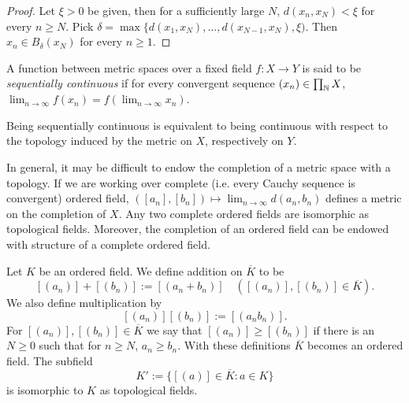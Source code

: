     \begin{proof}
        Let $\xi>0$ be given, then for a sufficiently large $N$, $d(x_n,x_N)<\xi$ for every $n\geq N$. Pick $\delta = \max\{ d(x_1,x_N),\dots,d(x_{N-1},x_N),\xi)$. Then $x_n\in B_\delta(x_N)$ for every $n\geq 1$.
    \end{proof}
    \begin{definition}
        A function between metric spaces over a fixed field $f:X\rightarrow Y$ is said to be \textit{sequentially continuous} if for every convergent sequence $(x_n)\in \prod_{\mathbb{N}} X$, $\lim_{n\to \infty} f(x_n)=f(\lim_{n\to \infty} x_n)$. 
    \end{definition}
    \begin{remark}
        Being sequentially continuous is equivalent to being continuous with respect to the topology induced by the metric on $X$, respectively on $Y$.
    \end{remark}
    In general, it may be difficult to endow the completion of a metric space with a topology. If we are working over complete (i.e. every Cauchy sequence is convergent) ordered field, $([a_n],[b_n])\mapsto \lim_{n\to\infty} d(a_n,b_n)$ defines a metric on the completion of $X$. Any two complete ordered fields are isomorphic as topological fields. Moreover, the completion of an ordered field can be endowed with structure of a complete ordered field.
    \begin{lemma}
        Let $K$ be an ordered field. We define addition on $\overline{K}$ to be 
        $$[(a_n)]+[(b_n)]:=[(a_n+b_n)] \quad ([(a_n)],[(b_n)]\in \overline{K}).$$
        We also define multiplication by 
        $$[(a_n)][(b_n)]:= [(a_nb_n)].$$
        For $[(a_n)],[(b_n)]\in \overline{K}$ we say that $[(a_n)]\geq [(b_n)]$ if there is an $N\geq 0$ such that for $n\geq N$, $a_n\geq b_n$. With these definitions $\overline{K}$ becomes an ordered field. The subfield 
        $$K':=\{[(a)]\in\overline{K} : a\in K\}$$
        is isomorphic to $K$ as topological fields.
    \end{lemma}
